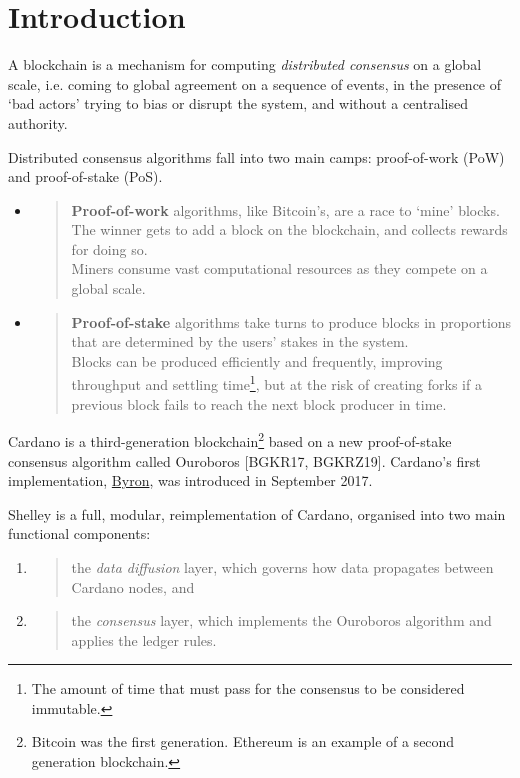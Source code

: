 \documentclass[11pt,a4paper]{article}
\begin{document}
\section{Introduction}
\label{introduction}

A blockchain is a mechanism for computing \emph{distributed consensus}
on a global scale, i.e. coming to global agreement on a sequence of
events, in the presence of `bad actors' trying to bias or disrupt the
system, and without a centralised authority.

Distributed consensus algorithms fall into two main camps: proof-of-work
(PoW) and proof-of-stake (PoS).

\begin{itemize}
\item
  \begin{quote}
  \textbf{Proof-of-work} algorithms, like Bitcoin's, are a race to
  `mine' blocks. The winner gets to add a block on the blockchain, and
  collects rewards for doing so.\\
  Miners consume vast computational resources as they compete on a
  global scale.
  \end{quote}
\item
  \begin{quote}
  \textbf{Proof-of-stake} algorithms take turns to produce blocks in
  proportions that are determined by the users' stakes in the system.\\
  Blocks can be produced efficiently and frequently, improving
  throughput and settling time\footnote{The amount of time that must
    pass for the consensus to be considered immutable.}, but at the risk
  of creating forks if a previous block fails to reach the next block
  producer in time.
  \end{quote}
\end{itemize}

Cardano is a third-generation blockchain\footnote{Bitcoin was the first
  generation. Ethereum is an example of a second generation blockchain.}
based on a new proof-of-stake consensus algorithm called Ouroboros
{[}BGKR17, BGKRZ19{]}. Cardano's first implementation,
\href{https://cardanoroadmap.com/en/byron/}{{Byron}}, was introduced in
September 2017.

Shelley is a full, modular, reimplementation of Cardano, organised into
two main functional components:

\begin{enumerate}
\def\labelenumi{\arabic{enumi}.}
\item
  \begin{quote}
  the \emph{data diffusion} layer, which governs how data propagates
  between Cardano nodes, and
  \end{quote}
\item
  \begin{quote}
  the \emph{consensus} layer, which implements the Ouroboros algorithm
  and applies the ledger rules.
  \end{quote}
\end{enumerate}
\end{document}
